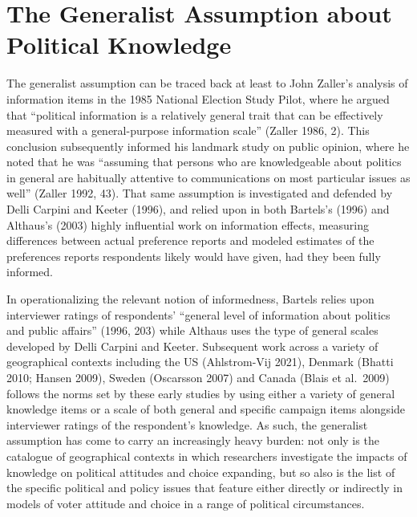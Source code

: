 \documentclass[11pt,halfline,a4paper,]{ouparticle}
\begin{document}
\hypertarget{the-generalist-assumption-about-political-knowledge}{%
\section{The Generalist Assumption about Political
Knowledge}\label{the-generalist-assumption-about-political-knowledge}}

The generalist assumption can be traced back at least to John Zaller's
analysis of information items in the 1985 National Election Study Pilot,
where he argued that ``political information is a relatively general
trait that can be effectively measured with a general-purpose
information scale'' (Zaller 1986, 2). This conclusion subsequently
informed his landmark study on public opinion, where he noted that he
was ``assuming that persons who are knowledgeable about politics in
general are habitually attentive to communications on most particular
issues as well'' (Zaller 1992, 43). That same assumption is investigated
and defended by Delli Carpini and Keeter (1996), and relied upon in both
Bartels's (1996) and Althaus's (2003) highly influential work on
information effects, measuring differences between actual preference
reports and modeled estimates of the preferences reports respondents
likely would have given, had they been fully informed.

In operationalizing the relevant notion of informedness, Bartels relies
upon interviewer ratings of respondents' ``general level of information
about politics and public affairs'' (1996, 203) while Althaus uses the
type of general scales developed by Delli Carpini and Keeter. Subsequent
work across a variety of geographical contexts including the US
(Ahlstrom-Vij 2021), Denmark (Bhatti 2010; Hansen 2009), Sweden
(Oscarsson 2007) and Canada (Blais et al.~2009) follows the norms set by
these early studies by using either a variety of general knowledge items
or a scale of both general and specific campaign items alongside
interviewer ratings of the respondent's knowledge. As such, the
generalist assumption has come to carry an increasingly heavy burden:
not only is the catalogue of geographical contexts in which researchers
investigate the impacts of knowledge on political attitudes and choice
expanding, but so also is the list of the specific political and policy
issues that feature either directly or indirectly in models of voter
attitude and choice in a range of political circumstances.
\end{document}
